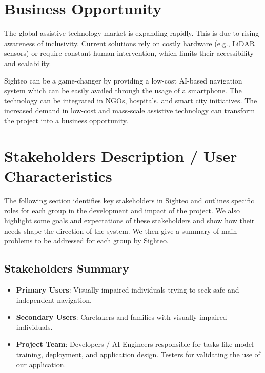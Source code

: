 \documentclass{FastFyp}
\begin{document}
\section{Business Opportunity}
The global assistive technology market is expanding rapidly. This is due to rising awareness of inclusivity. Current solutions rely on costly hardware (e.g., LiDAR sensors) or require constant human intervention, which limits their accessibility and scalability.

Sighteo can be a game-changer by providing a low-cost AI-based navigation system which can be easily availed through the usage of a smartphone. The technology can be integrated in NGOs, hospitals, and smart city initiatives. The increased demand in low-cost and mass-scale assistive technology can transform the project into a business opportunity.

\section{Stakeholders Description / User Characteristics}
The following section identifies key stakeholders in Sighteo and outlines specific roles for each group in the development and impact of the project. We also highlight some goals and expectations of these stakeholders and show how their needs shape the direction of the system. We then give a summary of main problems to be addressed for each group by Sighteo.
\subsection{Stakeholders Summary}
\begin{itemize}
    \item \textbf{Primary Users}: Visually impaired individuals trying to seek safe and independent navigation.
    \item \textbf{Secondary Users}: Caretakers and families with visually impaired individuals.
    \item \textbf{Project Team}: Developers / AI Engineers responsible for tasks like model training, deployment, and application design. Testers for validating the use of our application.
\end{itemize}
\end{document}
